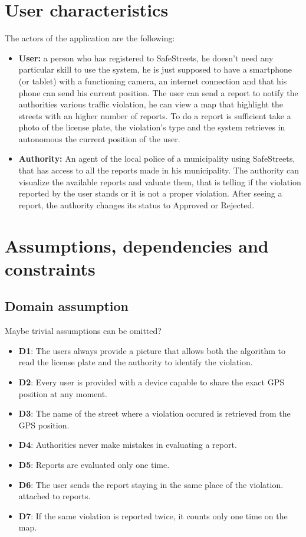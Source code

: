 \documentclass[12pt,a4paper]{report}
\begin{document}
	\section{User characteristics}
		The actors of the application are the following:
		\begin{itemize}
			\item \textbf{User:}
				a person who has registered to SafeStreets, he doesn't need any particular skill to use the system, 
				he is just supposed to have a smartphone (or tablet) with a functioning camera, an internet connection and
				that his phone can send his current position. The user can send a report to notify the authorities various traffic
				violation, he can view a map that highlight the streets with an higher number of reports. To do a report is sufficient
				take a photo of the license plate, the violation's type and the system retrieves in autonomous the current position
				of the user.
			\item \textbf{Authority:}
				An agent of the local police of a municipality using SafeStreets, that has access to all the reports made in his municipality. The authority can visualize the available reports and valuate them, that is telling if the violation reported by the user stands or it is not a proper violation. After seeing a report, the authority changes its status to Approved or Rejected.
		\end{itemize}
	\section{Assumptions, dependencies and constraints}
	\subsection{Domain assumption}
Maybe trivial assumptions can be omitted?
		\begin{itemize}
			\item \textbf{D1}: The users always provide a picture that allows both the algorithm to read the license plate and the authority to identify the violation.
			\item \textbf{D2}: Every user is provided with a device capable to share the exact GPS position at any moment.
			\item \textbf{D3}: The name of the street where a violation occured is retrieved from the GPS position.
			\item \textbf{D4}: Authorities never make mistakes in evaluating a report.
			\item \textbf{D5}: Reports are evaluated only one time.
			\item \textbf{D6}: The user sends the report staying in the same place of the violation. attached to reports.
			\item \textbf{D7}: If the same violation is reported twice, it counts only one time on the map.
		\end{itemize}
\end{document}

